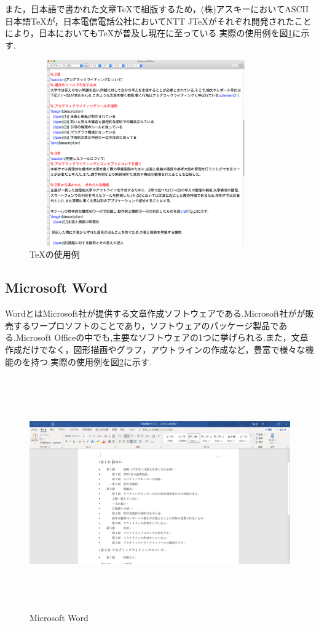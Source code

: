 \documentclass[a4j,12pt]{jarticle}
\begin{document}
また，日本語で書かれた文章\TeX で組版するため，(株)アスキーにおいてASCII日本語\TeX が，日本電信電話公社においてNTT J\TeX がそれぞれ開発されたことにより，日本においても\TeX が普及し現在に至っている\cite{ren3}.実際の使用例を図\ref{fig:c}に示す.

\begin{figure}[H]
\begin{center}
 \includegraphics[clip,width=100mm,height=80mm]{figure/TEX.png}
 \end{center}
 \caption{\TeX の使用例}
 \label{fig:c}
\end{figure}

\subsection{Microsoft Word}
WordとはMicrosoft社が提供する文章作成ソフトウェアである.Microsoft社がが販売するワープロソフトのことであり，ソフトウェアのパッケージ製品である.Microsoft Officeの中でも,主要なソフトウェアの1つに挙げられる.また，文章作成だけでなく，図形描画やグラフ，アウトラインの作成など，豊富で様々な機能のを持つ.実際の使用例を図\ref{fig:d}に示す.

\begin{figure}[H]
\begin{center}
 \includegraphics[clip,width=130mm,height=100mm]{figure/word.png}
 \end{center}
 \caption{Microsoft Word}
 \label{fig:d}
\end{figure}
\end{document}
